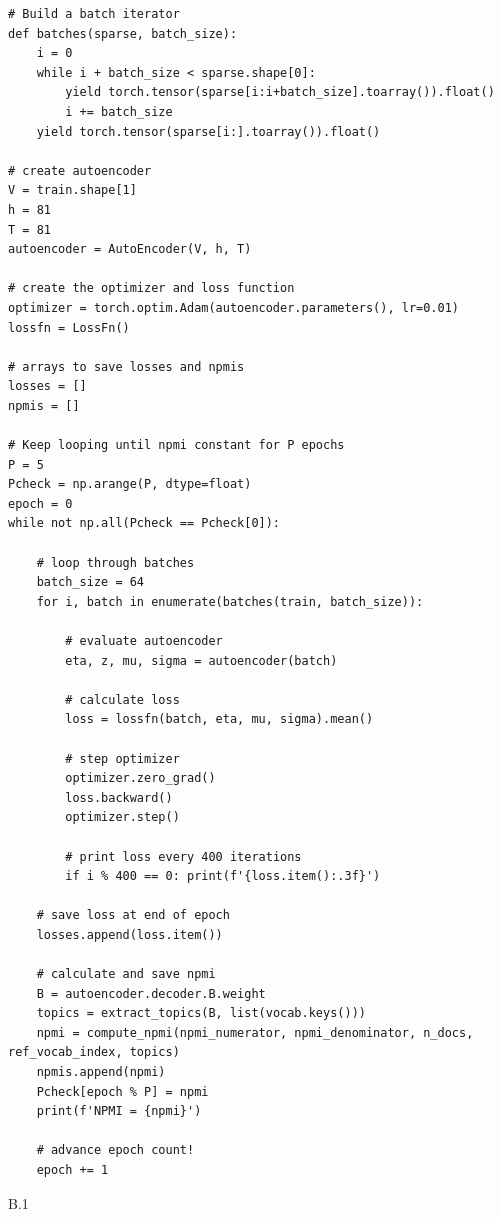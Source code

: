 \documentclass{article}
\begin{document}
\begin{enumerate}
\begin{verbatim}
# Build a batch iterator
def batches(sparse, batch_size):
    i = 0
    while i + batch_size < sparse.shape[0]:
        yield torch.tensor(sparse[i:i+batch_size].toarray()).float()
        i += batch_size
    yield torch.tensor(sparse[i:].toarray()).float()

# create autoencoder
V = train.shape[1]
h = 81
T = 81
autoencoder = AutoEncoder(V, h, T)

# create the optimizer and loss function
optimizer = torch.optim.Adam(autoencoder.parameters(), lr=0.01)
lossfn = LossFn()

# arrays to save losses and npmis
losses = []
npmis = []

# Keep looping until npmi constant for P epochs
P = 5
Pcheck = np.arange(P, dtype=float)
epoch = 0
while not np.all(Pcheck == Pcheck[0]):
    
    # loop through batches
    batch_size = 64
    for i, batch in enumerate(batches(train, batch_size)):

        # evaluate autoencoder
        eta, z, mu, sigma = autoencoder(batch)

        # calculate loss
        loss = lossfn(batch, eta, mu, sigma).mean()
        
        # step optimizer
        optimizer.zero_grad()
        loss.backward()
        optimizer.step()
        
        # print loss every 400 iterations
        if i % 400 == 0: print(f'{loss.item():.3f}')
         
    # save loss at end of epoch
    losses.append(loss.item())
    
    # calculate and save npmi
    B = autoencoder.decoder.B.weight
    topics = extract_topics(B, list(vocab.keys()))
    npmi = compute_npmi(npmi_numerator, npmi_denominator, n_docs, ref_vocab_index, topics)
    npmis.append(npmi)
    Pcheck[epoch % P] = npmi
    print(f'NPMI = {npmi}')
    
    # advance epoch count!
    epoch += 1
        \end{verbatim}
\end{enumerate}




\newpage

B.1
\end{document}
